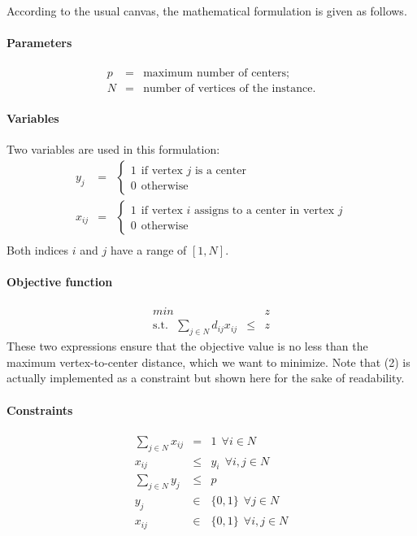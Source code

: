 \documentclass[a4paper,10pt]{article}
\begin{document}
	According to the usual canvas, the mathematical formulation is given as follows.
	\paragraph{Parameters} 
	\begin{eqnarray*}
		p &=& \text{maximum number of centers;} \\
		N &=& \text{number of vertices of the instance.} 
	\end{eqnarray*}
	\paragraph{Variables} Two variables are used in this formulation:
	\begin{eqnarray*}
		y_j &=& \begin{cases}
 				1 ~~\text{if vertex $j$ is a center} \\
 				0 ~~\text{otherwise}
 			\end{cases} \\
 		x_{ij} &=& \begin{cases}
 				1 ~~\text{if vertex $i$ assigns to a center in vertex $j$} \\
 				0 ~~\text{otherwise}
 			\end{cases} \\
	\end{eqnarray*}
	Both indices $i$ and $j$ have a range of $[1, N]$.
	
	\paragraph{Objective function}
	\begin{eqnarray}
		min && z\\
		\text{s.t.}~~~ \sum_{j \in N} d_{ij} x_{ij} &\leq& z \label{eq:2}
	\end{eqnarray}
	These two expressions ensure that the objective value is no less than the maximum vertex-to-center distance, which we want to minimize. Note that (2) is actually implemented as a constraint but shown here for the sake of readability.
	
	\paragraph{Constraints}
	\begin{eqnarray}
		\sum_{j \in N} x_{ij} &=& 1 ~~\forall i \in N \\
		x_{ij} &\leq& y_i ~~\forall i,j \in N \\
		\sum_{j \in N} y_j &\leq& p \\
		y_j &\in& \{ 0,1 \} ~~\forall j \in N \\
		x_{ij} &\in& \{0 , 1 \} ~~\forall i,j \in N 
	\end{eqnarray}
	
\end{document}
